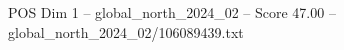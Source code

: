 \begin{textsample}{POS Dim 1 – global\_north\_2024\_02 – Score 47.00 – global\_north\_2024\_02/106089439.txt}
\end{textsample}

